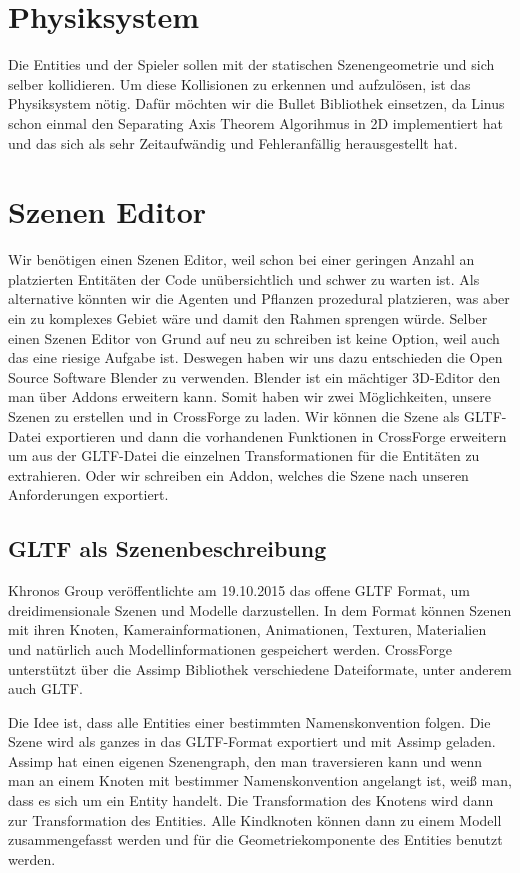 \section{Physiksystem}

Die Entities und der Spieler sollen mit der statischen Szenengeometrie und sich selber kollidieren. Um diese Kollisionen zu erkennen und aufzulösen, ist das Physiksystem nötig. Dafür möchten wir die Bullet Bibliothek einsetzen, da Linus schon einmal den Separating Axis Theorem Algorihmus in 2D implementiert hat und das sich als sehr Zeitaufwändig und Fehleranfällig herausgestellt hat. 


\section{Szenen Editor}

Wir benötigen einen Szenen Editor, weil schon bei einer geringen Anzahl an platzierten Entitäten der Code unübersichtlich und schwer zu warten ist. Als alternative könnten wir die Agenten und Pflanzen prozedural platzieren, was aber ein zu komplexes Gebiet wäre und damit den Rahmen sprengen würde. Selber einen Szenen Editor von Grund auf neu zu schreiben ist keine Option, weil auch das eine riesige Aufgabe ist. Deswegen haben wir uns dazu entschieden die Open Source Software Blender zu verwenden. Blender ist ein mächtiger 3D-Editor den man über Addons erweitern kann. Somit haben wir zwei Möglichkeiten, unsere Szenen zu erstellen und in CrossForge zu laden. Wir können die Szene als GLTF-Datei exportieren und dann die vorhandenen Funktionen in CrossForge erweitern um aus der GLTF-Datei die einzelnen Transformationen für die Entitäten zu extrahieren. Oder wir schreiben ein Addon, welches die Szene nach unseren Anforderungen exportiert.

\subsection{GLTF als Szenenbeschreibung}

Khronos Group veröffentlichte am 19.10.2015 das offene GLTF Format, um dreidimensionale Szenen und Modelle darzustellen. In dem Format können Szenen mit ihren Knoten, Kamerainformationen, Animationen, Texturen, Materialien und natürlich auch Modellinformationen gespeichert werden. CrossForge unterstützt über die Assimp Bibliothek verschiedene Dateiformate, unter anderem auch GLTF.

Die Idee ist, dass alle Entities einer bestimmten Namenskonvention folgen. Die Szene wird als ganzes in das GLTF-Format exportiert und mit Assimp geladen. Assimp hat einen eigenen Szenengraph, den man traversieren kann und wenn man an einem Knoten mit bestimmer Namenskonvention angelangt ist, weiß man, dass es sich um ein Entity handelt. Die Transformation des Knotens wird dann zur Transformation des Entities. Alle Kindknoten können dann zu einem Modell zusammengefasst werden und für die Geometriekomponente des Entities benutzt werden.

